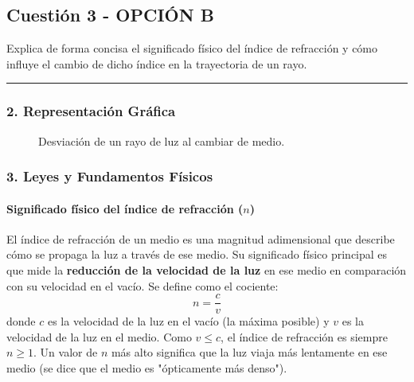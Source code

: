 \newpage

\subsection{Cuestión 3 - OPCIÓN B}
\label{subsec:3B_2009_jun_ord}

\begin{cajaenunciado}
Explica de forma concisa el significado físico del índice de refracción y cómo influye el cambio de dicho índice en la trayectoria de un rayo.
\end{cajaenunciado}
\hrule

\subsubsection*{2. Representación Gráfica}
\begin{figure}[H]
    \centering
    \caption{Desviación de un rayo de luz al cambiar de medio.}
\end{figure}

\subsubsection*{3. Leyes y Fundamentos Físicos}
\paragraph{Significado físico del índice de refracción ($n$)}
El índice de refracción de un medio es una magnitud adimensional que describe cómo se propaga la luz a través de ese medio. Su significado físico principal es que mide la \textbf{reducción de la velocidad de la luz} en ese medio en comparación con su velocidad en el vacío. Se define como el cociente:
$$ n = \frac{c}{v} $$
donde $c$ es la velocidad de la luz en el vacío (la máxima posible) y $v$ es la velocidad de la luz en el medio.
Como $v \le c$, el índice de refracción es siempre $n \ge 1$. Un valor de $n$ más alto significa que la luz viaja más lentamente en ese medio (se dice que el medio es "ópticamente más denso").

